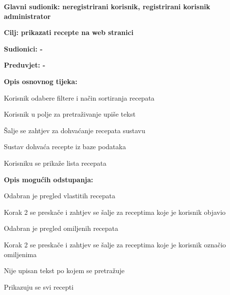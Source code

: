 					\noindent {}
					\begin{packed_item}
						\item \textbf{Glavni sudionik: neregistrirani korisnik, registrirani korisnik administrator}
						\item  \textbf{Cilj: prikazati recepte na web stranici}
						\item  \textbf{Sudionici: -}
						\item  \textbf{Preduvjet: -}
						
						\item  \textbf{Opis osnovnog tijeka:}
						\item[] \begin{packed_enum}
							\item Korisnik odabere filtere i način sortiranja recepata
							\item Korisnik u polje za pretraživanje upiše tekst
							\item Šalje se zahtjev za dohvaćanje recepata sustavu
							\item Sustav dohvaća recepte iz baze podataka
							\item Korisniku se prikaže lista recepata
						\end{packed_enum}
						
						\item  \textbf{Opis mogućih odstupanja:}
						\item[] \begin{packed_item}
							\item[1.a] Odabran je pregled vlastitih recepata
							\begin{packed_enum}
								\item Korak 2 se preskače i zahtjev se šalje za receptima koje je korisnik objavio
							\end{packed_enum}
							\item[1.b] Odabran je pregled omiljenih recepata
							\begin{packed_enum}
								\item Korak 2 se preskače i zahtjev se šalje za receptima koje je korisnik označio omiljenima
							\end{packed_enum}
							\item [2.a] Nije upisan tekst po kojem se pretražuje
							\begin{packed_enum}
								\item Prikazuju se svi recepti
							\end{packed_enum}
						\end{packed_item}
					\end{packed_item}


